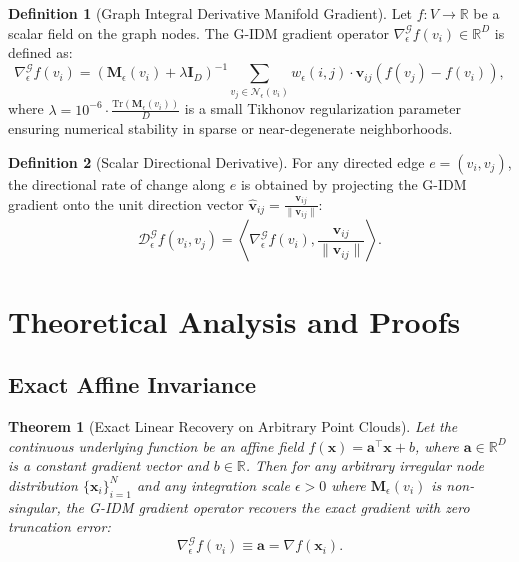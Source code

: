 \documentclass[11pt,a4paper]{article}
\newtheorem{theorem}{Theorem}
\theoremstyle{definition}
\newtheorem{definition}{Definition}
\begin{document}
\begin{definition}[Graph Integral Derivative Manifold Gradient]
Let $f: V \to \mathbb{R}$ be a scalar field on the graph nodes. The G-IDM gradient operator $\nabla_\epsilon^{\mathcal{G}} f(v_i) \in \mathbb{R}^D$ is defined as:
\begin{equation}
\nabla_\epsilon^{\mathcal{G}} f(v_i) = \left( \mathbf{M}_\epsilon(v_i) + \lambda \mathbf{I}_D \right)^{-1} \sum_{v_j \in \mathcal{N}_\epsilon(v_i)} w_\epsilon(i, j) \cdot \mathbf{v}_{ij} \left( f(v_j) - f(v_i) \right),
\label{eq:gidm_gradient_def}
\end{equation}
where $\lambda = 10^{-6} \cdot \frac{\text{Tr}(\mathbf{M}_\epsilon(v_i))}{D}$ is a small Tikhonov regularization parameter ensuring numerical stability in sparse or near-degenerate neighborhoods.
\end{definition}

\begin{definition}[Scalar Directional Derivative]
For any directed edge $e = (v_i, v_j)$, the directional rate of change along $e$ is obtained by projecting the G-IDM gradient onto the unit direction vector $\hat{\mathbf{v}}_{ij} = \frac{\mathbf{v}_{ij}}{\|\mathbf{v}_{ij}\|}$:
\begin{equation}
\mathcal{D}_\epsilon^{\mathcal{G}} f(v_i, v_j) = \left\langle \nabla_\epsilon^{\mathcal{G}} f(v_i), \frac{\mathbf{v}_{ij}}{\|\mathbf{v}_{ij}\|} \right\rangle.
\end{equation}
\end{definition}


\section{Theoretical Analysis and Proofs}
\label{sec:theory}

\subsection{Exact Affine Invariance}

\begin{theorem}[Exact Linear Recovery on Arbitrary Point Clouds]
\label{thm:exact_linear_recovery}
Let the continuous underlying function be an affine field $f(\mathbf{x}) = \mathbf{a}^\top \mathbf{x} + b$, where $\mathbf{a} \in \mathbb{R}^D$ is a constant gradient vector and $b \in \mathbb{R}$. 
Then for any arbitrary irregular node distribution $\{\mathbf{x}_i\}_{i=1}^N$ and any integration scale $\epsilon > 0$ where $\mathbf{M}_\epsilon(v_i)$ is non-singular, the G-IDM gradient operator recovers the exact gradient with zero truncation error:
\begin{equation}
\nabla_\epsilon^{\mathcal{G}} f(v_i) \equiv \mathbf{a} = \nabla f(\mathbf{x}_i).
\end{equation}
\end{theorem}
\end{document}
